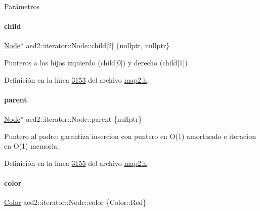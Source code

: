 \begin{DoxyParams}{\-Parámetros}
\paragraph{\texorpdfstring{child}{child}}
{\footnotesize\ttfamily \hyperlink{structaed2_1_1iterator_1_1Node}{Node}$\ast$ aed2\+::iterator\+::\+Node\+::child\mbox{[}2\mbox{]} \{nullptr, nullptr\}}



Punteros a los hijos izquierdo (child\mbox{[}0\mbox{]}) y derecho (child\mbox{[}1\mbox{]}) 



Definición en la línea \hyperlink{map2_8h_source_l03153}{3153} del archivo \hyperlink{map2_8h_source}{map2.\+h}.

\mbox{\label{structaed2_1_1iterator_1_1Node_a7f097f76a613a17fc9d03c8f153cb5e4_a7f097f76a613a17fc9d03c8f153cb5e4}} 
\paragraph{\texorpdfstring{parent}{parent}}
{\footnotesize\ttfamily \hyperlink{structaed2_1_1iterator_1_1Node}{Node}$\ast$ aed2\+::iterator\+::\+Node\+::parent \{nullptr\}}



Puntero al padre\+: garantiza insercion con puntero en O(1) amortizado e iteracion en O(1) memoria. 



Definición en la línea \hyperlink{map2_8h_source_l03155}{3155} del archivo \hyperlink{map2_8h_source}{map2.\+h}.

\mbox{\label{structaed2_1_1iterator_1_1Node_a07d4b83de27938ece64e1a6db4a055cc_a07d4b83de27938ece64e1a6db4a055cc}} 
\paragraph{\texorpdfstring{color}{color}}
{\footnotesize\ttfamily \hyperlink{classaed2_1_1iterator_aaa188f82ba585d8de525b1400242cf4f_aaa188f82ba585d8de525b1400242cf4f}{Color} aed2\+::iterator\+::\+Node\+::color \{Color\+::\+Red\}}




\end{DoxyParams}
